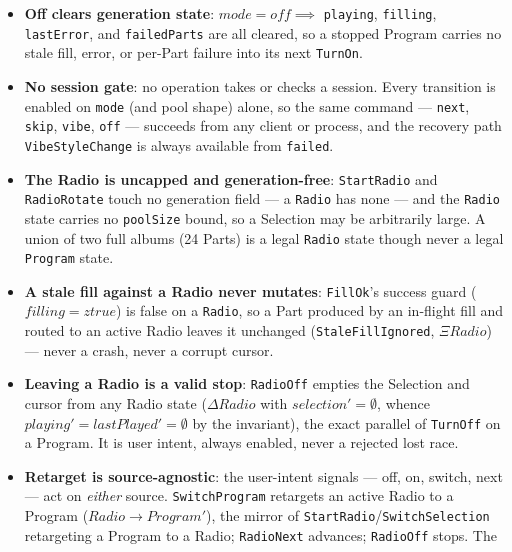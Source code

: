 \documentclass[a4paper,10pt,fleqn]{article}
\begin{document}
\begin{itemize}
    \texttt{RetryExhausted} requires $pool = \emptyset$, so the cap forces
    \texttt{failed} only when nothing is playing; a non-empty pool tolerates
    transient errors indefinitely, recovering via \texttt{Recover} while
    playback continues.
  \item \textbf{Off clears generation state}: $mode = off \implies$
    \texttt{playing}, \texttt{filling}, \texttt{lastError}, and
    \texttt{failedParts} are all cleared, so a stopped Program carries no stale
    fill, error, or per-Part failure into its next \texttt{TurnOn}.
  \item \textbf{No session gate}: no operation takes or checks a session. Every
    transition is enabled on \texttt{mode} (and pool shape) alone, so the same
    command --- \texttt{next}, \texttt{skip}, \texttt{vibe}, \texttt{off} ---
    succeeds from any client or process, and the recovery path
    \texttt{VibeStyleChange} is always available from \texttt{failed}.
  \item \textbf{The Radio is uncapped and generation-free}: \texttt{StartRadio}
    and \texttt{RadioRotate} touch no generation field --- a \texttt{Radio} has
    none --- and the \texttt{Radio} state carries no \texttt{poolSize} bound, so
    a Selection may be arbitrarily large. A union of two full albums (24 Parts)
    is a legal \texttt{Radio} state though never a legal \texttt{Program} state.
  \item \textbf{A stale fill against a Radio never mutates}: \texttt{FillOk}'s
    success guard ($filling = ztrue$) is false on a \texttt{Radio}, so a Part
    produced by an in-flight fill and routed to an active Radio leaves it
    unchanged (\texttt{StaleFillIgnored}, $\Xi Radio$) --- never a crash, never
    a corrupt cursor.
  \item \textbf{Leaving a Radio is a valid stop}: \texttt{RadioOff} empties the
    Selection and cursor from any Radio state ($\Delta Radio$ with
    $selection' = \emptyset$, whence $playing' = lastPlayed' = \emptyset$ by the
    invariant), the exact parallel of \texttt{TurnOff} on a Program. It is user
    intent, always enabled, never a rejected lost race.
  \item \textbf{Retarget is source-agnostic}: the user-intent signals --- off,
    on, switch, next --- act on \emph{either} source. \texttt{SwitchProgram}
    retargets an active Radio to a Program ($Radio \to Program'$), the mirror of
    \texttt{StartRadio}/\texttt{SwitchSelection} retargeting a Program to a
    Radio; \texttt{RadioNext} advances; \texttt{RadioOff} stops. The

\end{itemize}
\end{document}
